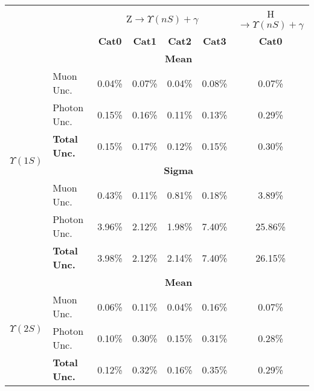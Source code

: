 
\begin{tabular}{cl|c|c|c|c|c|}
\cline{3-7}
\multicolumn{1}{l}{}                      &      & \multicolumn{4}{c|}{Z$\rightarrow \Upsilon(nS) + \gamma$} & H$\rightarrow \Upsilon(nS) + \gamma$ \\ \cline{3-7}
\multicolumn{1}{l}{}                      &                     & \textbf{Cat0}  & \textbf{Cat1}  & \textbf{Cat2}  & \textbf{Cat3} & \textbf{Cat0}        \\ \hline


\multicolumn{1}{|c|}{\multirow{8}{*}{$\Upsilon(1S)$}} & \multicolumn{6}{c|}{\textbf{Mean}} \\ \cline{2-7}
\multicolumn{1}{|c|}{}                    & Muon Unc.           & 0.04\% & 0.07\% & 0.04\% & 0.08\% & 0.07\% \\ \cline{2-7}
\multicolumn{1}{|c|}{}                    & Photon Unc.         & 0.15\% & 0.16\% & 0.11\% & 0.13\% & 0.29\% \\ \cline{2-7}
\multicolumn{1}{|c|}{}                    & \textbf{Total Unc.} & 0.15\% & 0.17\% & 0.12\% & 0.15\% & 0.30\% \\ \cline{2-7}


\multicolumn{1}{|c|}{}                    & \multicolumn{6}{c|}{\textbf{Sigma}}            \\ \cline{2-7}
\multicolumn{1}{|c|}{}                    & Muon Unc.           & 0.43\% & 0.11\% & 0.81\% & 0.18\% & 3.89\% \\ \cline{2-7}
\multicolumn{1}{|c|}{}                    & Photon Unc.         & 3.96\% & 2.12\% & 1.98\% & 7.40\% & 25.86\% \\ \cline{2-7}
\multicolumn{1}{|c|}{}                    & \textbf{Total Unc.} & 3.98\% & 2.12\% & 2.14\% & 7.40\% & 26.15\% \\ \hline \hline



\multicolumn{1}{|c|}{\multirow{8}{*}{$\Upsilon(2S)$}} & \multicolumn{6}{c|}{\textbf{Mean}} \\ \cline{2-7}
\multicolumn{1}{|c|}{}                    & Muon Unc.           & 0.06\% & 0.11\% & 0.04\% & 0.16\% & 0.07\% \\ \cline{2-7}
\multicolumn{1}{|c|}{}                    & Photon Unc.         & 0.10\% & 0.30\% & 0.15\% & 0.31\% & 0.28\% \\ \cline{2-7}
\multicolumn{1}{|c|}{}                    & \textbf{Total Unc.} & 0.12\% & 0.32\% & 0.16\% & 0.35\% & 0.29\% \\ \cline{2-7}



\end{tabular}
